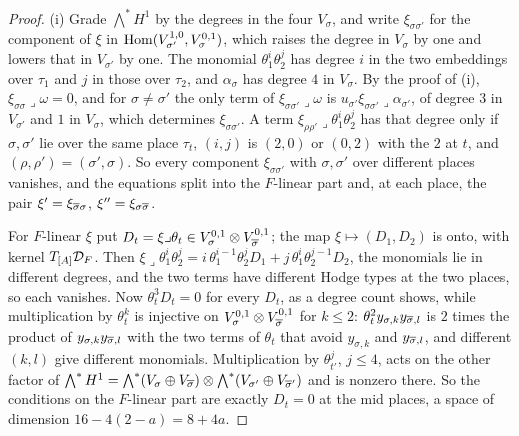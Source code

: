 \begin{proof}
(i) Grade $\bigwedge^{*}H^{1}$ by the degrees in the four $V_{\sigma}$, and
write $\xi_{\sigma\sigma'}$ for the component of $\xi$ in
$\operatorname{Hom}(V_{\sigma'}^{1,0},V_{\sigma}^{0,1})$, which raises the degree in
$V_{\sigma}$ by one and lowers that in $V_{\sigma'}$ by one. The monomial
$\theta_{1}^{i}\theta_{2}^{j}$ has degree $i$ in the two embeddings over
$\tau_{1}$ and $j$ in those over $\tau_{2}$, and $\alpha_{\sigma}$ has degree
$4$ in $V_{\sigma}$. By the proof of (i),
$\xi_{\sigma\sigma}\lrcorner\omega=0$, and for $\sigma\ne\sigma'$ the only
term of $\xi_{\sigma\sigma'}\lrcorner\omega$ is
$u_{\sigma'}\xi_{\sigma\sigma'}\lrcorner\alpha_{\sigma'}$, of degree $3$ in
$V_{\sigma'}$ and $1$ in $V_{\sigma}$, which determines $\xi_{\sigma\sigma'}$.
A term $\xi_{\rho\rho'}\lrcorner\theta_{1}^{i}\theta_{2}^{j}$ has that degree
only if $\sigma,\sigma'$ lie over the same place $\tau_{t}$, $(i,j)$ is
$(2,0)$ or $(0,2)$ with the $2$ at $t$, and $(\rho,\rho')=(\sigma',\sigma)$.
So every component $\xi_{\sigma\sigma'}$ with $\sigma,\sigma'$ over different
places vanishes, and the equations split into the $F$-linear part and, at
each place, the pair $\xi'=\xi_{\overline{\sigma}\sigma}$, $\xi''=\xi_{\sigma\overline{\sigma}}$.

For $F$-linear $\xi$ put $D_{t}=\xi\lrcorner\theta_{t}\in V_{\sigma}^{0,1}
\otimes V_{\overline{\sigma}}^{0,1}$; the map $\xi\mapsto(D_{1},D_{2})$ is onto, with
kernel $T_{[A]}\mathcal{D}_{F}$. Then $\xi\lrcorner\theta_{1}^{i}\theta_{2}^{j}
=i\,\theta_{1}^{i-1}\theta_{2}^{j}D_{1}+j\,\theta_{1}^{i}\theta_{2}^{j-1}D_{2}$,
the monomials lie in different degrees, and the two terms have different
Hodge types at the two places, so each vanishes. Now $\theta_{t}^{3}D_{t}=0$
for every $D_{t}$, as a degree count shows, while multiplication by
$\theta_{t}^{k}$ is injective on $V_{\sigma}^{0,1}\otimes V_{\overline{\sigma}}^{0,1}$
for $k\le2$: $\theta_{t}^{2}y_{\sigma,k}y_{\overline{\sigma},l}$ is $2$ times the
product of $y_{\sigma,k}y_{\overline{\sigma},l}$ with the two terms of $\theta_{t}$
that avoid $y_{\sigma,k}$ and $y_{\overline{\sigma},l}$, and different $(k,l)$ give
different monomials. Multiplication by $\theta_{t'}^{j}$, $j\le4$, acts on the
other factor of $\bigwedge^{*}H^{1}=\bigwedge^{*}(V_{\sigma}\oplus
V_{\overline{\sigma}})\otimes\bigwedge^{*}(V_{\sigma'}\oplus V_{\overline{\sigma}'})$ and is
nonzero there. So the conditions on the $F$-linear part are exactly $D_{t}=0$
at the mid places, a space of dimension $16-4(2-a)=8+4a$.


\end{proof}
